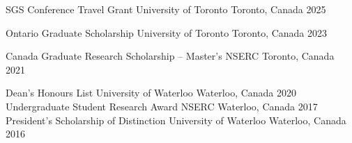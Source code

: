 
\begin{cvhonors}

    \cvhonor
    {SGS Conference Travel Grant}
    {University of Toronto}
    {Toronto, Canada}
    {2025}

\cvhonor
    {Ontario Graduate Scholarship}
    {University of Toronto}
    {Toronto, Canada}
    {2023}

\cvhonor
    {Canada Graduate Research Scholarship -- Master's}
    {NSERC}
    {Toronto, Canada} %
    {2021} %


\cvhonor
    {Dean's Honours List}
    {University of Waterloo}
    {Waterloo, Canada} %
    {2020} %
\cvhonor
    {Undergraduate Student Research Award}
    {NSERC}
    {Waterloo, Canada}
    {2017}
\cvhonor
    {President's Scholarship of Distinction}
    {University of Waterloo}
    {Waterloo, Canada}
    {2016}
\end{cvhonors}








